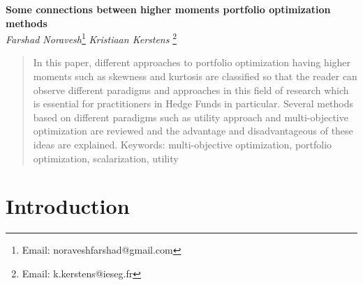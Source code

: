 \documentclass[12pt,a4paper]{article}
\numberwithin{equation}{section}
\begin{document}
\begin{titlepage}
   \begin{center}
      \Large\textbf{Some connections between higher moments portfolio optimization methods}\\
	  \large\textit{Farshad Noravesh}\footnote{Email: noraveshfarshad@gmail.com}	  
	  \large\textit{Kristiaan Kerstens} \footnote{Email: k.kerstens@ieseg.fr}      
      
   \end{center}
\begin{abstract}
In this paper, different approaches to portfolio optimization having higher moments such as skewness and kurtosis are classified so that the reader can observe different paradigms and approaches in this field of research which is essential for practitioners in Hedge Funds in particular. Several methods based on different paradigms such as utility approach and multi-objective optimization are reviewed and the advantage and disadvantageous of these ideas are explained.
Keywords: multi-objective optimization, portfolio optimization, scalarization, utility
\end{abstract}     


\end{titlepage}
 	
   
                                  
\section{Introduction}
\end{document}
